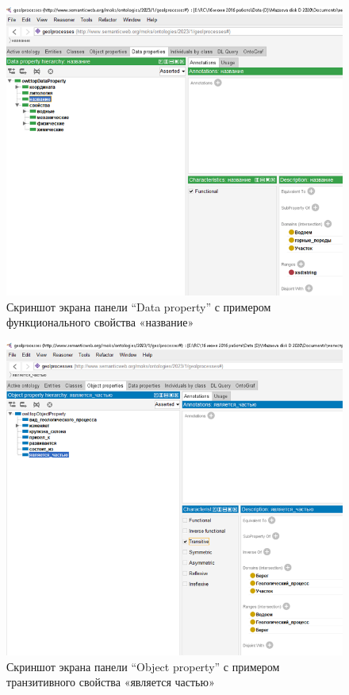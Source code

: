 \documentclass[732,14pt,final]{studrep}
\begin{document}
  \begin{figure}[htp]
	\centering
	\includegraphics[width=0.9\linewidth]{pics/image8.png}
    \caption{Скриншот экрана панели “Data property” с примером функционального свойства «название»}
    \label{fig:data-props}
  \end{figure}

  \begin{figure}[htp]
	\centering
	\includegraphics[width=0.9\linewidth]{pics/image11.png}
    \caption{Скриншот экрана панели “Object property” с примером транзитивного свойства «является частью»}
    \label{fig:obj-props-trans}
  \end{figure}
\end{document}
